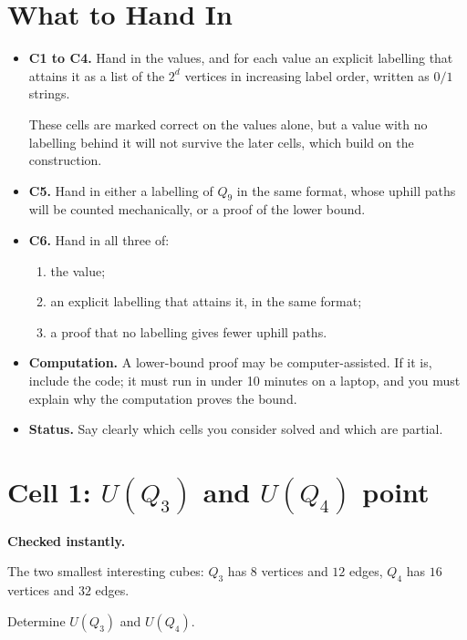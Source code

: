 \documentclass[11pt]{article}
\theoremstyle{definition}
\newcommand{\cell}[3]{%
  \section*{Cell #1: #2\hfill{\normalsize\mdseries #3}}}
\begin{document}
\section*{What to Hand In}

\begin{itemize}[leftmargin=*]
  \item \textbf{C1 to C4.}
    Hand in the values, and for each value an explicit labelling that
    attains it as a list of the $2^d$ vertices in increasing label
    order, written as $0/1$ strings.

    These cells are marked correct on the values alone, but a value
    with no labelling behind it will not survive the later cells,
    which build on the construction.
  \item \textbf{C5.}
    Hand in either a labelling of $Q_9$ in the same format, whose
    uphill paths will be counted mechanically, or a proof of the
    lower bound.
  \item \textbf{C6.}
    Hand in all three of:
    \begin{enumerate}[leftmargin=*]
      \item the value;
      \item an explicit labelling that attains it, in the same format;
      \item a proof that no labelling gives fewer uphill paths.
    \end{enumerate}
  \item \textbf{Computation.}
    A lower-bound proof may be computer-assisted. If it is, include
    the code; it must run in under 10 minutes on a laptop, and you
    must explain why the computation proves the bound.
  \item \textbf{Status.}
    Say clearly which cells you consider solved and which are
    partial.
\end{itemize}

\cell{1}{$U(Q_3)$ and $U(Q_4)$}{1 point}

\textbf{Checked instantly.}

The two smallest interesting cubes: $Q_3$ has $8$ vertices and $12$
edges, $Q_4$ has $16$ vertices and $32$ edges.

Determine $U(Q_3)$ and $U(Q_4)$.
\end{document}
